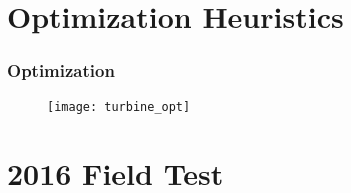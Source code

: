 \documentclass[mathserif]{beamer}
\begin{document}

\section{Optimization Heuristics}
%
%
\begin{frame}
 \frametitle{Optimization}

    \begin{figure}[htb]
     \centering
     \texttt{[image: turbine\_opt]}
    \end{figure}
 


\end{frame}



\section{2016 Field Test}
%
%

\end{document}

